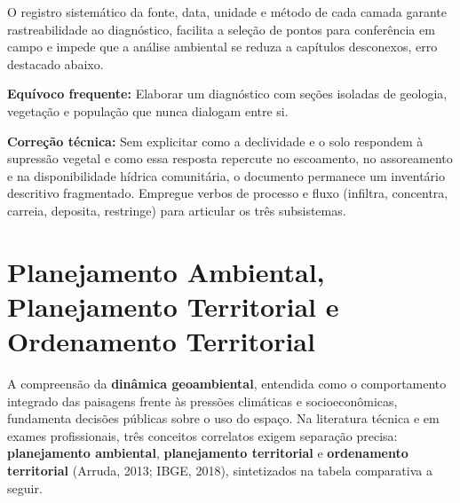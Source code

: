 O registro sistemático da fonte, data, unidade e método de cada camada garante rastreabilidade ao diagnóstico, facilita a seleção de pontos para conferência em campo e impede que a análise ambiental se reduza a capítulos desconexos, erro destacado abaixo.

\begin{boxErro}
  \textbf{Equívoco frequente:} Elaborar um diagnóstico com seções isoladas de geologia, vegetação e população que nunca dialogam entre si.\par
  \textbf{Correção técnica:} Sem explicitar como a declividade e o solo respondem à supressão vegetal e como essa resposta repercute no escoamento, no assoreamento e na disponibilidade hídrica comunitária, o documento permanece um inventário descritivo fragmentado. Empregue verbos de processo e fluxo (infiltra, concentra, carreia, deposita, restringe) para articular os três subsistemas.
\end{boxErro}

\section{Planejamento Ambiental, Planejamento Territorial e Ordenamento Territorial}

A compreensão da \textbf{dinâmica geoambiental}, entendida como o comportamento integrado das paisagens frente às pressões climáticas e socioeconômicas, fundamenta decisões públicas sobre o uso do espaço. Na literatura técnica e em exames profissionais, três conceitos correlatos exigem separação precisa: \textbf{planejamento ambiental}, \textbf{planejamento territorial} e \textbf{ordenamento territorial} (Arruda, 2013; IBGE, 2018), sintetizados na tabela comparativa a seguir.

